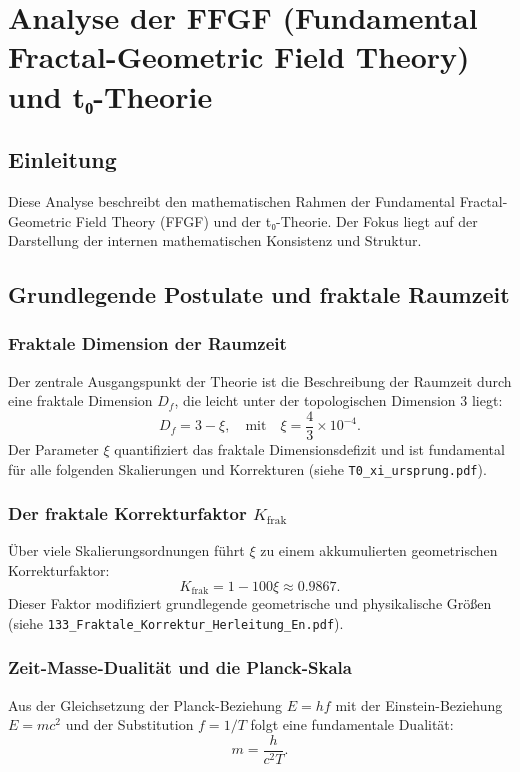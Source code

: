 \chapter{Analyse der FFGF (Fundamental Fractal-Geometric Field Theory) und t₀-Theorie}

	
	\section{Einleitung}
	Diese Analyse beschreibt den mathematischen Rahmen der Fundamental Fractal-Geometric Field Theory (FFGF) und der t₀-Theorie. Der Fokus liegt auf der Darstellung der internen mathematischen Konsistenz und Struktur.
	
	\section{Grundlegende Postulate und fraktale Raumzeit}
	\subsection{Fraktale Dimension der Raumzeit}
	Der zentrale Ausgangspunkt der Theorie ist die Beschreibung der Raumzeit durch eine fraktale Dimension \(D_f\), die leicht unter der topologischen Dimension 3 liegt:
	\begin{equation}
		D_f = 3 - \xi, \quad \text{mit} \quad \xi = \frac{4}{3} \times 10^{-4}.
		\label{eq:fractal_dimension}
	\end{equation}
	Der Parameter \(\xi\) quantifiziert das fraktale Dimensionsdefizit und ist fundamental für alle folgenden Skalierungen und Korrekturen 
	(siehe \texttt{T0\_xi\_ursprung.pdf}).
	
	\subsection{Der fraktale Korrekturfaktor \(K_{\text{frak}}\)}
	Über viele Skalierungsordnungen führt \(\xi\) zu einem akkumulierten geometrischen Korrekturfaktor:
	\begin{equation}
		K_{\text{frak}} = 1 - 100\xi \approx 0.9867.
		\label{eq:K_frak}
	\end{equation}
	Dieser Faktor modifiziert grundlegende geometrische und physikalische Größen 
	(siehe \texttt{133\_Fraktale\_Korrektur\_Herleitung\_En.pdf}).
	
	\subsection{Zeit-Masse-Dualität und die Planck-Skala}
	Aus der Gleichsetzung der Planck-Beziehung \(E = hf\) mit der Einstein-Beziehung \(E = mc^2\) und der Substitution \(f = 1/T\) folgt eine fundamentale Dualität:
	\begin{equation}
		m = \frac{h}{c^2 T}.
		\label{eq:time_mass_duality}
	\end{equation}
